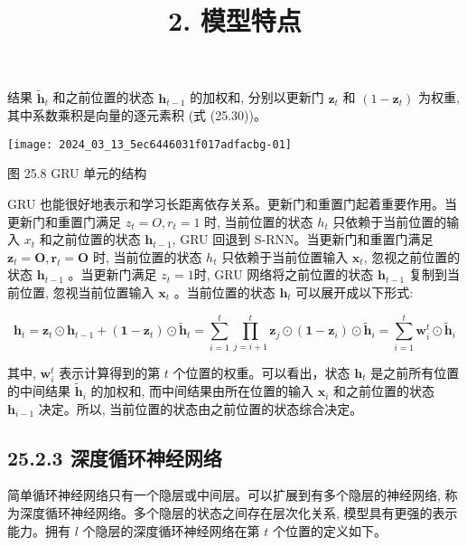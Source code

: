 \documentclass[10pt]{article}
\title{2. 模型特点 }
\author{}
\date{}
\begin{document}
\maketitle
结果 $\tilde{\boldsymbol{h}}_{t}$ 和之前位置的状态 $\boldsymbol{h}_{t-1}$ 的加权和, 分别以更新门 $\boldsymbol{z}_{t}$ 和 $\left(1-\boldsymbol{z}_{t}\right)$ 为权重, 其中系数乘积是向量的逐元素积 (式 (25.30))。

\begin{center}
\texttt{[image: 2024\_03\_13\_5ec6446031f017adfacbg-01]}
\end{center}

图 25.8 GRU 单元的结构

GRU 也能很好地表示和学习长距离依存关系。更新门和重置门起着重要作用。当更新门和重置门满足 $z_{t}=O, r_{t}=1$ 时, 当前位置的状态 $h_{t}$ 只依赖于当前位置的输入 $x_{t}$ 和之前位置的状态 $\boldsymbol{h}_{t-1}$, GRU 回退到 S-RNN。当更新门和重置门满足 $\boldsymbol{z}_{t}=\boldsymbol{O}, \boldsymbol{r}_{t}=\boldsymbol{O}$ 时, 当前位置的状态 $h_{t}$ 只依赖于当前位置输入 $\boldsymbol{x}_{t}$, 忽视之前位置的状态 $\boldsymbol{h}_{t-1}$ 。当更新门满足 $z_{t}=1$时, GRU 网络将之前位置的状态 $\boldsymbol{h}_{t-1}$ 复制到当前位置, 忽视当前位置输入 $\boldsymbol{x}_{t}$ 。当前位置的状态 $\boldsymbol{h}_{t}$ 可以展开成以下形式:


\begin{equation*}
\boldsymbol{h}_{t}=\boldsymbol{z}_{t} \odot \boldsymbol{h}_{t-1}+\left(\boldsymbol{1}-\boldsymbol{z}_{t}\right) \odot \tilde{\boldsymbol{h}}_{t}=\sum_{i=1}^{t} \prod_{j=i+1}^{t} \boldsymbol{z}_{j} \odot\left(\boldsymbol{1}-\boldsymbol{z}_{i}\right) \odot \tilde{\boldsymbol{h}}_{i}=\sum_{i=1}^{t} \boldsymbol{w}_{i}^{t} \odot \tilde{\boldsymbol{h}}_{i} \tag{25.31}
\end{equation*}


其中, $\boldsymbol{w}_{i}^{t}$ 表示计算得到的第 $t$ 个位置的权重。可以看出，状态 $\boldsymbol{h}_{t}$ 是之前所有位置的中间结果 $\tilde{\boldsymbol{h}}_{i}$ 的加权和, 而中间结果由所在位置的输入 $\boldsymbol{x}_{i}$ 和之前位置的状态 $\boldsymbol{h}_{i-1}$ 决定。所以, 当前位置的状态由之前位置的状态综合决定。

\subsection*{25.2.3 深度循环神经网络}
简单循环神经网络只有一个隐层或中间层。可以扩展到有多个隐层的神经网络, 称为深度循环神经网络。多个隐层的状态之间存在层次化关系, 模型具有更强的表示能力。拥有 $l$ 个隐层的深度循环神经网络在第 $t$ 个位置的定义如下。
\end{document}
